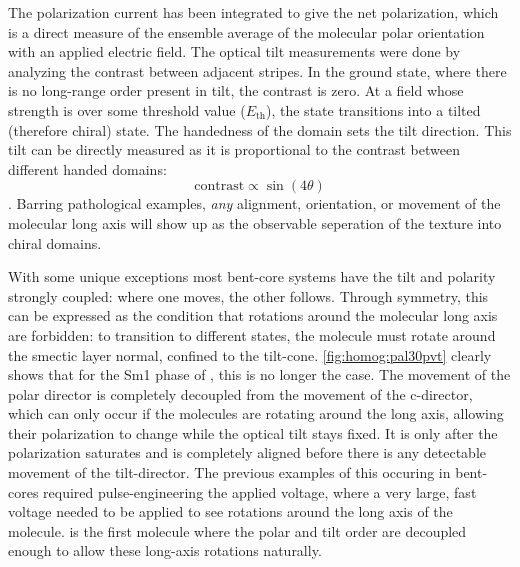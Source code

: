\documentclass[aagreenthesis]{subfiles}
\begin{document}
The polarization current has been integrated to give the net polarization, which
is a direct measure of the ensemble average of the molecular polar orientation with an
applied electric field. The optical tilt measurements were done by analyzing the
contrast between adjacent stripes. In the ground
state, where there is no long-range order present in tilt, the contrast is zero.
At a field whose strength is over some threshold value ($E_\textrm{th}$), the
state transitions into a tilted (therefore chiral) state. The handedness of the
domain sets the tilt direction. This tilt can be directly measured as it is
proportional to the contrast between different handed domains:
\begin{equation}
    \textrm{contrast}\propto \sin(4\theta)
\end{equation}.
Barring pathological examples, \textit{any} alignment, orientation, or movement
of the molecular long axis will show up as the observable seperation of the
texture into chiral domains. 


With some unique exceptions\cite{michi}
most bent-core systems have the tilt and
polarity strongly coupled: where one moves, the other follows. Through symmetry,
this can be expressed as the condition that rotations around the molecular long
axis are forbidden: to transition to different states, the molecule must rotate
around the smectic layer normal, confined to the tilt-cone.
\autoref{fig:homog:pal30pvt} clearly shows that for the Sm1 phase of
\nfour{}, this is no longer the case. The movement of the polar
director is completely decoupled from the
movement of the c-director, which can only occur if the \nfour{} molecules
are rotating around the long axis, allowing their polarization to change while
the optical tilt stays fixed. It is only
after the polarization saturates and is completely aligned
before there is any detectable movement of the tilt-director. The previous
examples of this occuring in bent-cores required pulse-engineering the applied
voltage,
where a very large, fast voltage needed to be applied to see rotations around
the long axis of the molecule. \nfour{} is the first molecule where the polar
and tilt order are decoupled enough to allow these long-axis rotations
naturally.
\end{document}
